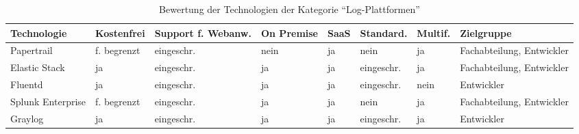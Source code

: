 \begin{table}[H]%
\centering
\addtolength{\leftskip}{-2cm}
\addtolength{\rightskip}{-2cm}
\begin{tabular}{|p{3.05cm}|p{1.8cm}|p{1.7cm}|p{1.2cm}|p{1.3cm}|p{1.7cm}|p{1.3cm}|p{2.6cm}|}
\hline
Technologie & Kostenfrei & Support f. Webanw. & On \mbox{Premise} & SaaS & Standard. & Multif. & Zielgruppe \\
\hline
Papertrail & f. begrenzt & eingeschr. & nein & ja & nein & ja & Fachabteilung, Entwickler \\
\hline
Elastic Stack & ja & eingeschr. & ja & ja & eingeschr. & ja & Fachabteilung, Entwickler \\
\hline
Fluentd & ja & eingeschr. & ja & ja & eingeschr. & nein & Entwickler \\
\hline
Splunk \mbox{Enterprise} & f. begrenzt & eingeschr. & ja & ja & nein & ja & Fachabteilung, Entwickler \\
\hline
Graylog & ja & eingeschr. & ja & ja & eingeschr. & ja & Entwickler \\
\hline
\end{tabular}
\caption{Bewertung der Technologien der Kategorie \enquote{Log-Plattformen}}
\label{tab:technologie-bewertung-log-plattformen}
\end{table}
